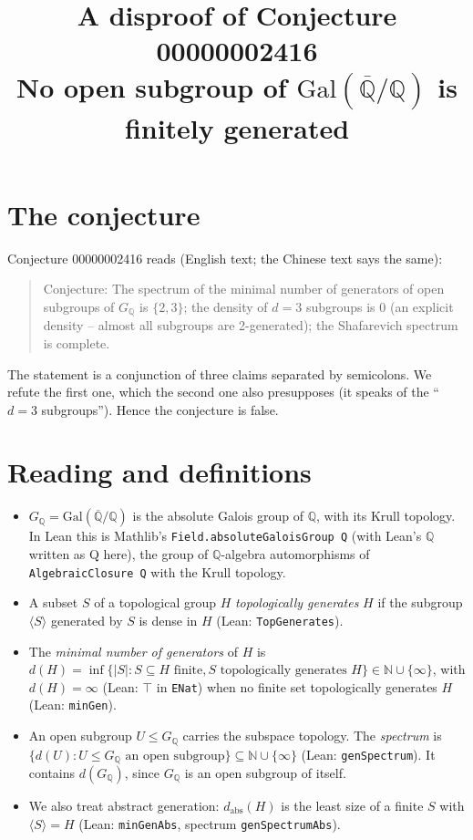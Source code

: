 \documentclass[11pt]{article}
\title{A disproof of Conjecture 00000002416\\[2pt]
\large No open subgroup of $\mathrm{Gal}(\overline{\mathbb{Q}}/\mathbb{Q})$ is finitely generated}
\date{}
\theoremstyle{definition}
\theoremstyle{remark}
\renewcommand{\_}{\oldus\allowbreak}
\newcommand{\Q}{\mathbb{Q}}
\newcommand{\Qb}{\overline{\mathbb{Q}}}
\newcommand{\GQ}{G_{\mathbb{Q}}}
\begin{document}
\sloppy
\maketitle

\section{The conjecture}

Conjecture 00000002416 reads (English text; the Chinese text says the same):
\begin{quote}
Conjecture: The spectrum of the minimal number of generators of open subgroups of $G_\Q$ is $\{2,3\}$;
the density of $d=3$ subgroups is $0$ (an explicit density -- almost all subgroups are 2-generated);
the Shafarevich spectrum is complete.
\end{quote}
The statement is a conjunction of three claims separated by semicolons. We refute the first one, which
the second one also presupposes (it speaks of the ``$d=3$ subgroups''). Hence the conjecture is false.

\section{Reading and definitions}

\begin{itemize}[leftmargin=*]
\item $\GQ=\mathrm{Gal}(\Qb/\Q)$ is the absolute Galois group of $\Q$, with its Krull topology. In Lean
  this is Mathlib's \texttt{Field.absoluteGaloisGroup Q} (with Lean's $\Q$ written as Q here), the group of $\Q$-algebra automorphisms of
  \texttt{AlgebraicClosure Q} with the Krull topology.
\item A subset $S$ of a topological group $H$ \emph{topologically generates} $H$ if the subgroup
  $\langle S\rangle$ generated by $S$ is dense in $H$ (Lean: \texttt{TopGenerates}).
\item The \emph{minimal number of generators} of $H$ is
  $d(H)=\inf\{|S| : S\subseteq H \text{ finite}, S \text{ topologically generates } H\}\in\mathbb{N}\cup\{\infty\}$,
  with $d(H)=\infty$ (Lean: $\top$ in \texttt{ENat}) when no finite set topologically generates $H$
  (Lean: \texttt{minGen}).
\item An open subgroup $U\le\GQ$ carries the subspace topology. The \emph{spectrum} is
  $\{d(U): U\le \GQ \text{ an open subgroup}\}\subseteq \mathbb{N}\cup\{\infty\}$ (Lean: \texttt{genSpectrum}).
  It contains $d(\GQ)$, since $\GQ$ is an open subgroup of itself.
\item We also treat abstract generation: $d_{\mathrm{abs}}(H)$ is the least size of a finite $S$ with
  $\langle S\rangle=H$ (Lean: \texttt{minGenAbs}, spectrum \texttt{genSpectrumAbs}).
\end{itemize}
\end{document}
